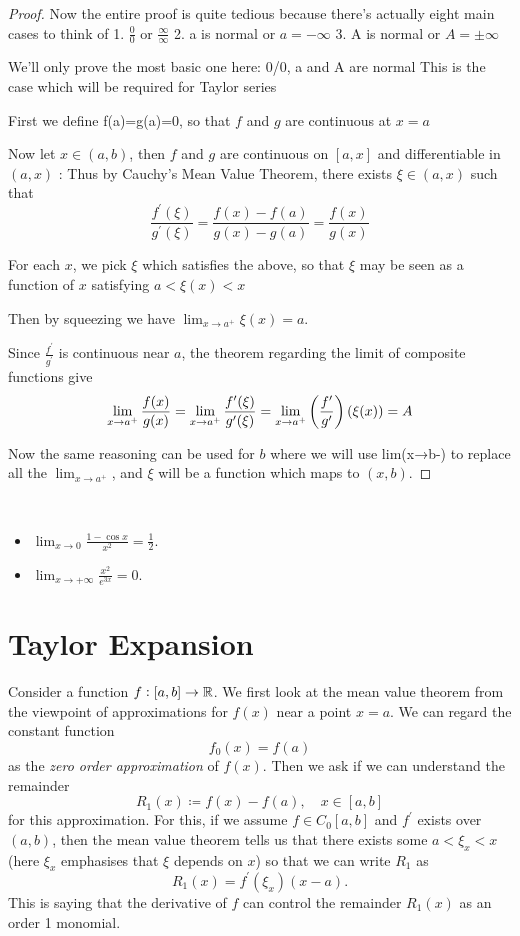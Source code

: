 \begin{proof}
Now the entire proof is quite tedious because there's actually eight main cases to think of
1. $\frac{0}{0}$ or $\frac{\infty}{\infty}$
2. a is normal or $a=-\infty$
3. A is normal or $A=\pm\infty$

We'll only prove the most basic one here:
0/0, a and A are normal
This is the case which will be required for Taylor series

First we define f(a)=g(a)=0, so that $f$ and $g$ are continuous at $x=a$

Now let $x\in(a,b)$, then $f$ and $g$ are continuous on $[a,x]$ and differentiable in $(a,x)$
:
Thus by Cauchy's Mean Value Theorem, there exists $\xi\in(a,x)$ such that
\[ \frac{f^\prime(\xi)}{g^\prime(\xi)}=\frac{f(x)-f(a)}{g(x)-g(a)}=\frac{f(x)}{g(x)} \]

For each $x$, we pick $\xi$ which satisfies the above, so that $\xi$ may be seen as a function of $x$ satisfying $a<\xi(x)<x$

Then by squeezing we have $\lim_{x\to a^+}\xi(x)=a$.

Since $\frac{f^\prime}{g^\prime}$ is continuous near $a$, the theorem regarding the limit of composite functions give
\[ \lim_{x\to a^+}\frac{f(x)}{g(x)} = \lim_{x\to a^+}\frac{f'(\xi)}{g'(\xi)} = \lim_{x\to a^+}\left(\frac{f^\prime}{g^\prime}\right)(\xi(x)) = A \]

Now the same reasoning can be used for $b$ where we will use lim(x→b-) to replace all the $\lim_{x\to a^+}$, and $\xi$ will be a function which maps to $(x,b)$.
\end{proof}

\begin{example} \
\begin{itemize}
\item $\lim_{x\to0}\frac{1-\cos x}{x^2}=\frac{1}{2}$.
\item $\lim_{x\to+\infty}\frac{x^2}{e^{3x}}=0.$
\end{itemize}
\end{example}

\section{Taylor Expansion}
Consider a function $f:[a,b]\to\mathbb R$. We first look at the mean value theorem from the viewpoint of approximations for $f(x)$ near a point $x=a$. We can regard the constant function
\[ f_0(x)=f(a) \]
as the \emph{zero order approximation} of $f(x)$. Then we ask if we can understand the remainder
\[ R_1(x)\coloneqq f(x)-f(a), \quad x\in[a,b] \]
for this approximation. For this, if we assume $f\in C_0[a,b]$ and $f^\prime$ exists over $(a,b)$, then the mean value theorem tells us that there exists some $a<\xi_x<x$ (here $\xi_x$ emphasises that $\xi$ depends on $x$) so that we can write $R_1$ as
\[ R_1(x)=f^\prime(\xi_x)(x-a). \]
This is saying that the derivative of $f$ can control the remainder $R_1(x)$ as an order 1 monomial.




